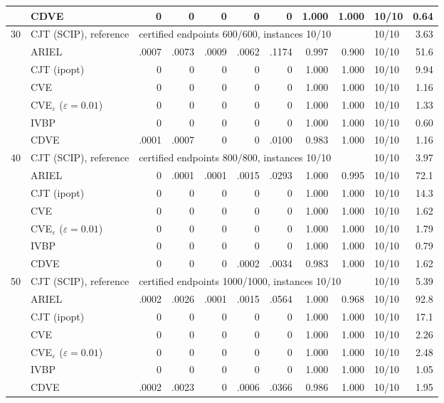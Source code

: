 \begin{table}[htbp]
\begin{tabular}{rlrrrrrrrlr}
 & CDVE & 0 & 0 & 0 & 0 & 0 & 1.000 & 1.000 & 10/10 & 0.64 \\
\midrule
30 & CJT (SCIP), reference & \multicolumn{7}{l}{certified endpoints 600/600, instances 10/10} & 10/10 & 3.63 \\
 & ARIEL & .0007 & .0073 & .0009 & .0062 & .1174 & 0.997 & 0.900 & 10/10 & 51.6 \\
 & CJT (ipopt) & 0 & 0 & 0 & 0 & 0 & 1.000 & 1.000 & 10/10 & 9.94 \\
 & CVE & 0 & 0 & 0 & 0 & 0 & 1.000 & 1.000 & 10/10 & 1.16 \\
 & CVE$_\varepsilon$ ($\varepsilon{=}0.01$) & 0 & 0 & 0 & 0 & 0 & 1.000 & 1.000 & 10/10 & 1.33 \\
 & IVBP & 0 & 0 & 0 & 0 & 0 & 1.000 & 1.000 & 10/10 & 0.60 \\
 & CDVE & .0001 & .0007 & 0 & 0 & .0100 & 0.983 & 1.000 & 10/10 & 1.16 \\
\midrule
40 & CJT (SCIP), reference & \multicolumn{7}{l}{certified endpoints 800/800, instances 10/10} & 10/10 & 3.97 \\
 & ARIEL & 0 & .0001 & .0001 & .0015 & .0293 & 1.000 & 0.995 & 10/10 & 72.1 \\
 & CJT (ipopt) & 0 & 0 & 0 & 0 & 0 & 1.000 & 1.000 & 10/10 & 14.3 \\
 & CVE & 0 & 0 & 0 & 0 & 0 & 1.000 & 1.000 & 10/10 & 1.62 \\
 & CVE$_\varepsilon$ ($\varepsilon{=}0.01$) & 0 & 0 & 0 & 0 & 0 & 1.000 & 1.000 & 10/10 & 1.79 \\
 & IVBP & 0 & 0 & 0 & 0 & 0 & 1.000 & 1.000 & 10/10 & 0.79 \\
 & CDVE & 0 & 0 & 0 & .0002 & .0034 & 0.983 & 1.000 & 10/10 & 1.62 \\
\midrule
50 & CJT (SCIP), reference & \multicolumn{7}{l}{certified endpoints 1000/1000, instances 10/10} & 10/10 & 5.39 \\
 & ARIEL & .0002 & .0026 & .0001 & .0015 & .0564 & 1.000 & 0.968 & 10/10 & 92.8 \\
 & CJT (ipopt) & 0 & 0 & 0 & 0 & 0 & 1.000 & 1.000 & 10/10 & 17.1 \\
 & CVE & 0 & 0 & 0 & 0 & 0 & 1.000 & 1.000 & 10/10 & 2.26 \\
 & CVE$_\varepsilon$ ($\varepsilon{=}0.01$) & 0 & 0 & 0 & 0 & 0 & 1.000 & 1.000 & 10/10 & 2.48 \\
 & IVBP & 0 & 0 & 0 & 0 & 0 & 1.000 & 1.000 & 10/10 & 1.05 \\
 & CDVE & .0002 & .0023 & 0 & .0006 & .0366 & 0.986 & 1.000 & 10/10 & 1.95 \\

\end{tabular}
\end{table}
